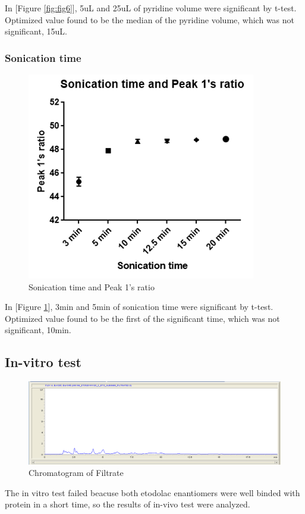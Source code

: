 \documentclass[12pt]{article} %
\begin{document}
 In [Figure \ref{fig:fig6}],  5uL and 25uL of pyridine volume were significant by t-test. Optimized value found to be the median of the pyridine volume, which was not significant, 15uL.

\subsubsection {Sonication time}

\begin{figure}[h!]
  \centering
  \includegraphics[width=0.6\linewidth]{fig7.png}
  \caption{Sonication time and Peak 1's ratio}
  \label{fig:fig7}
\end{figure}
  In [Figure \ref{fig:fig7}],  3min and 5min of sonication time were significant by t-test. Optimized value found to be the first of the significant time, which was not significant, 10min.



\subsection {In-vitro test}
\begin{figure}[h!]
  \centering
  \includegraphics[width=\linewidth]{fig8.png}
  \caption{Chromatogram of Filtrate}
  \label{fig:fig9}
\end{figure}
 The in vitro test failed beacuse both etodolac enantiomers were well binded with protein in a short time, so the results of in-vivo test were analyzed.
\end{document}

